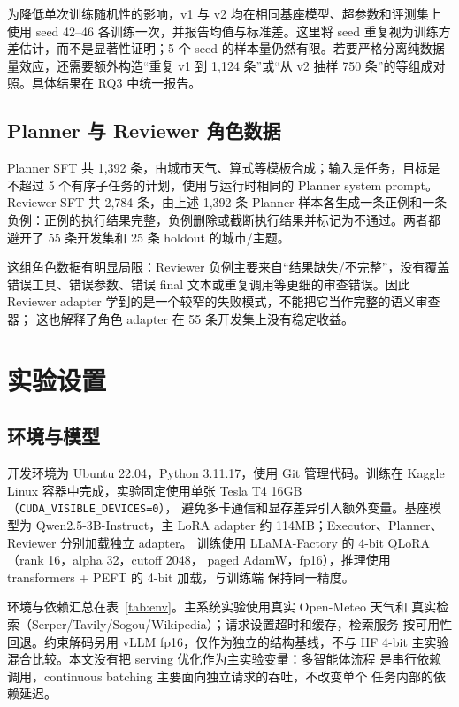 \documentclass[UTF8,a4paper,12pt]{ctexart}
\begin{document}
为降低单次训练随机性的影响，v1 与 v2 均在相同基座模型、超参数和评测集上使用 seed 42--46 各训练一次，并报告均值与标准差。这里将 seed 重复视为训练方差估计，而不是显著性证明；5 个 seed 的样本量仍然有限。若要严格分离纯数据量效应，还需要额外构造“重复 v1 到 1,124 条”或“从 v2 抽样 750 条”的等组成对照。具体结果在 RQ3 中统一报告。

\subsection{Planner 与 Reviewer 角色数据}
Planner SFT 共 1,392 条，由城市天气、算式等模板合成；输入是任务，目标是
不超过 5 个有序子任务的计划，使用与运行时相同的 Planner system prompt。
Reviewer SFT 共 2,784 条，由上述 1,392 条 Planner 样本各生成一条正例和一条
负例：正例的执行结果完整，负例删除或截断执行结果并标记为不通过。两者都
避开了 55 条开发集和 25 条 holdout 的城市/主题。

这组角色数据有明显局限：Reviewer 负例主要来自“结果缺失/不完整”，没有覆盖
错误工具、错误参数、错误 final 文本或重复调用等更细的审查错误。因此
Reviewer adapter 学到的是一个较窄的失败模式，不能把它当作完整的语义审查器；
这也解释了角色 adapter 在 55 条开发集上没有稳定收益。

\clearpage
\section{实验设置}\label{sec:experiments}
\subsection{环境与模型}
开发环境为 Ubuntu 22.04，Python 3.11.17，使用 Git 管理代码。训练在 Kaggle
Linux 容器中完成，实验固定使用单张 Tesla T4 16GB
（\texttt{CUDA\_VISIBLE\_DEVICES=0}），
避免多卡通信和显存差异引入额外变量。基座模型为 Qwen2.5-3B-Instruct，主
LoRA adapter 约 114MB；Executor、Planner、Reviewer 分别加载独立 adapter。
训练使用 LLaMA-Factory 的 4-bit QLoRA（rank 16，alpha 32，cutoff 2048，
paged AdamW，fp16），推理使用 transformers + PEFT 的 4-bit 加载，与训练端
保持同一精度。

环境与依赖汇总在表~\ref{tab:env}。主系统实验使用真实 Open-Meteo 天气和
真实检索（Serper/Tavily/Sogou/Wikipedia）；请求设置超时和缓存，检索服务
按可用性回退。约束解码另用 vLLM fp16，仅作为独立的结构基线，不与 HF
4-bit 主实验混合比较。本文没有把 serving 优化作为主实验变量：多智能体流程
是串行依赖调用，continuous batching 主要面向独立请求的吞吐，不改变单个
任务内部的依赖延迟。
\end{document}
